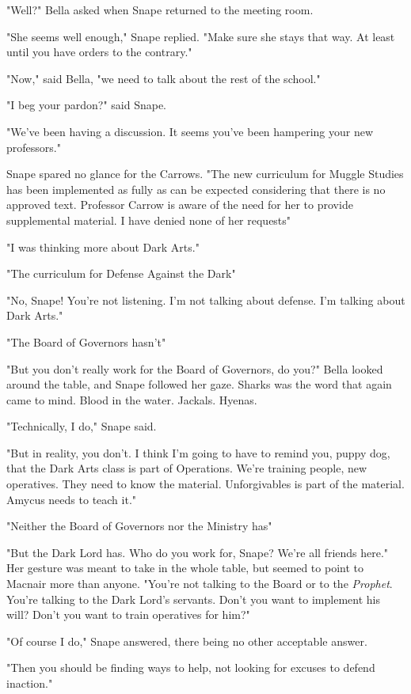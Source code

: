 "Well?" Bella asked when Snape returned to the meeting room.

"She seems well enough," Snape replied. "Make sure she stays that way. At least until you have orders to the contrary."

"Now," said Bella, "we need to talk about the rest of the school."

"I beg your pardon?" said Snape.

"We've been having a discussion. It seems you've been hampering your new professors."

Snape spared no glance for the Carrows. "The new curriculum for Muggle Studies has been implemented as fully as can be expected considering that there is no approved text. Professor Carrow is aware of the need for her to provide supplemental material. I have denied none of her requests{\el}"

"I was thinking more about Dark Arts."

"The curriculum for Defense Against the Dark{\el}"

"No, Snape! You're not listening. I'm not talking about defense. I'm talking about Dark Arts."

"The Board of Governors hasn't{\el}"

"But you don't really work for the Board of Governors, do you?" Bella looked around the table, and Snape followed her gaze. Sharks was the word that again came to mind. Blood in the water. Jackals. Hyenas.

"Technically, I do," Snape said.

"But in reality, you don't. I think I'm going to have to remind you, puppy dog, that the Dark Arts class is part of Operations. We're training people, new operatives. They need to know the material. Unforgivables is part of the material. Amycus needs to teach it."

"Neither the Board of Governors nor the Ministry has{\el}"

"But the Dark Lord has. Who do you work for, Snape? We're all friends here." Her gesture was meant to take in the whole table, but seemed to point to Macnair more than anyone. "You're not talking to the Board or to the \emph{Prophet}. You're talking to the Dark Lord's servants. Don't you want to implement his will? Don't you want to train operatives for him?"

"Of course I do," Snape answered, there being no other acceptable answer.

"Then you should be finding ways to help, not looking for excuses to defend inaction."

